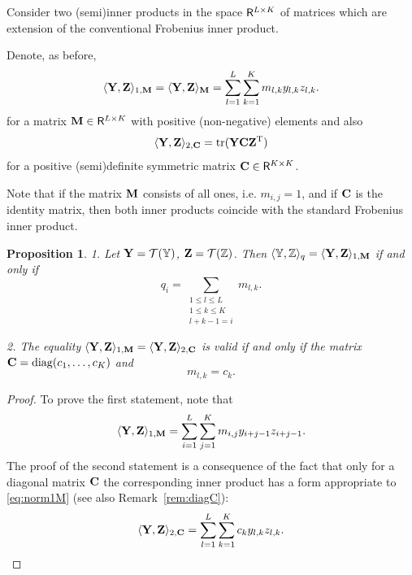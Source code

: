\documentclass[sii]{ipart}
\DeclareMathOperator{\tr}{tr}
\newtheorem{proposition}{Proposition}
\begin{document}
Consider two (semi)inner products in the space $\mathsf{R}^{L \times K}$ of matrices which are extension of the conventional Frobenius inner product.

Denote, as before,
\begin{equation}
\label{eq:norm1M}
\langle\bfY,\bfZ\rangle_{1,\bfM} = \langle\bfY,\bfZ\rangle_{\bfM} = \sum_{l = 1}^L \sum_{k=1}^K m_{l,k} y_{l,k} z_{l,k}.
\end{equation}
for a matrix $\mathbf{M}\in \mathsf{R}^{L\times K}$ with positive (non-negative) elements and also
\begin{equation}
\label{eq:norm2S}
\langle\bfY,\bfZ\rangle_{2,\bfC} = \tr(\bfY \bfC \bfZ^\rmT)
\end{equation}
for a positive (semi)definite symmetric matrix $\mathbf{C} \in \mathsf{R}^{K\times K}$.

Note that if the matrix $\mathbf{M}$ consists of all ones, i.e. $m_{i,j}=1$,
and if $\mathbf{C}$ is the identity matrix, then both inner products coincide with the standard Frobenius inner product.

\begin{proposition}
	\label{prop:equiv_tasks}
	1. Let $\mathbf{Y} = \mathcal{T}(\mathbb{Y})$,  $\mathbf{Z} = \mathcal{T}(\mathbb{Z})$. Then $\langle\mathbb{Y},\mathbb{Z}\rangle_q= \langle \mathbf{Y},\mathbf{Z} \rangle_{1,\mathbf{M}}$ if and only if
	\begin{equation}\label{qi_mi}
	q_i = \sum_{\substack{1 \le l \le L \\ 1 \le k \le K \\ l+k-1=i}} m_{l,k}.
	\end{equation}
	
	2. The equality $\langle\mathbf{Y},\mathbf{Z}\rangle_{1,\mathbf{M}}= \langle\mathbf{Y},\mathbf{Z}\rangle_{2,\mathbf{C}}$ is valid if and only if
the matrix $\mathbf{C}=\mathop{\mathrm{diag}}(c_1,\ldots,c_K)$ and
	\begin{equation}\label{sk_mlk}
	m_{l,k}=c_k.
	\end{equation}
\end{proposition}
\begin{proof}
	To prove the first statement, note that
	\begin{equation*}
	\langle \bfY, \bfZ \rangle_{1,\bfM} = \sum_{i = 1}^L \sum_{j = 1}^K m_{i,j} y_{i + j - 1} z_{i + j - 1}.
	\end{equation*}
The proof of the second statement is a consequence of the fact that only for a diagonal matrix $\mathbf{C}$ the corresponding inner product has a form appropriate to \eqref{eq:norm1M} (see also Remark~\ref{rem:diagC}):
	\begin{equation*}
	\langle \bfY, \bfZ \rangle_{2,\bfC} = \sum_{l=1}^L \sum_{k=1}^K c_k y_{l,k} z_{l, k}.
	\end{equation*}
\end{proof}
\end{document}

